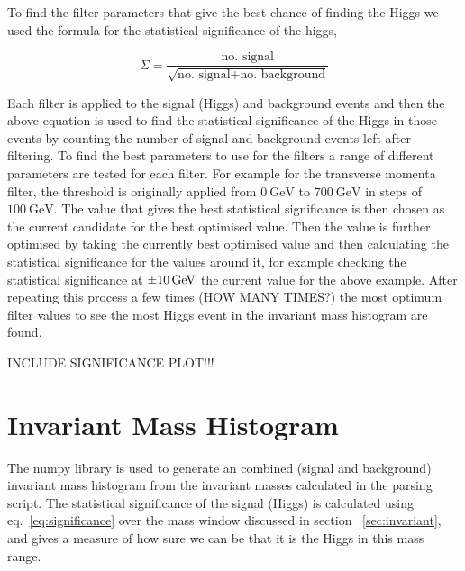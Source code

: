 \documentclass[11pt]{amsart}
\begin{document}
\begin{multicols}{2}
To find the filter parameters that give the best chance of finding the Higgs we used the formula for the statistical significance of the higgs,

\begin{equation}
  \label{eq:significance}
  \Sigma = \frac{\text{no. signal}}{\sqrt{\text{no. signal} + \text{no. background}}}
\end{equation}

Each filter is applied to the signal (Higgs) and background events and then the above equation is used to find the statistical significance of the Higgs in those events by counting the number of signal and background events left after filtering. To find the best parameters to use for the filters a range of different parameters are tested for each filter. For example for the transverse momenta filter, the threshold is originally applied from $\SI{0}{\giga\electronvolt}$ to $\SI{700}{\giga\electronvolt}$ in steps of $\SI{100}{\giga\electronvolt}$. The value that gives the best statistical significance is then chosen as the current candidate for the best optimised value. Then the value is further optimised by taking the currently best optimised value and then calculating the statistical significance for the values around it, for example checking the statistical significance at $\SI{\pm10}{\giga\electronvolt}$ the current value for the above example. After repeating this process a few times (HOW MANY TIMES?) the most optimum filter values to see the most Higgs event in the invariant mass histogram are found.

INCLUDE SIGNIFICANCE PLOT!!!


\section{Invariant Mass Histogram}

The numpy library is used to generate an combined (signal and background) invariant mass histogram from the invariant masses calculated in the parsing script. The statistical significance of the signal (Higgs) is calculated using eq.~\ref{eq:significance} over the mass window discussed in section ~\ref{sec:invariant}, and gives a measure of how sure we can be that it is the Higgs in this mass range.


\end{multicols}
\end{document}
